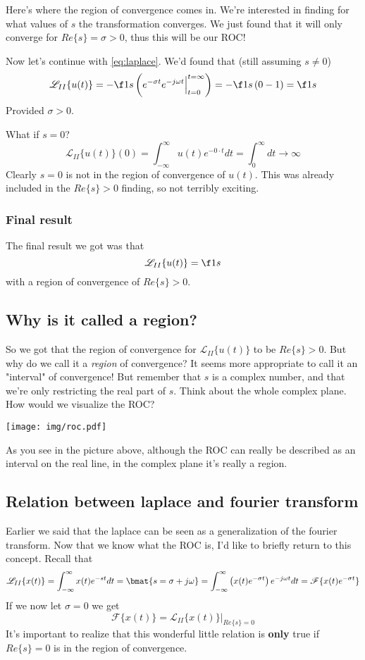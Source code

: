 \documentclass{article}
\newcommand{\0}{{\mathbf{0}}}
\begin{document}
Here's where the region of convergence comes in. We're interested in finding for what values of $s$ the transformation converges. We just
found that it will only converge for $Re\{ s \} = \sigma > 0$, thus this will be our ROC!

Now let's continue with \eqref{eq:laplace}.
We'd found that (still assuming $s\neq 0$)
$$  \mathscr{L}_{II} \{ u(t) \} = -\f 1s \left( e^{-\sigma t}e^{-j \omega t} \Big|_{t=0}^{t=\infty} \right) = -\f 1s \left( 0 - 1 \right) = \f 1s $$
Provided $\sigma > 0$.

What if $s=0$?
$$ \mathscr{L}_{II} \{ u(t) \}(0) = \int^{\infty}_{-\infty} u(t)e^{-0\cdot t} dt = \int^{\infty}_{0} dt \to \infty $$
Clearly $s=0$ is not in the region of convergence of $u(t)$. This was already included in the $Re\{ s \} > 0$ finding,
so not terribly exciting.

\subsubsection{Final result}
The final result we got was that
$$ \mathscr{L}_{II} \{ u(t) \} = \f 1s $$
with a region of convergence of $Re\{ s \} > 0$.

\clearpage
\subsection{Why is it called a region?}
So we got that the region of convergence for $\mathscr{L}_{II}\{ u(t) \}$ to be $Re\{ s \} > 0$. But why do
we call it a \textit{region} of convergence? It seems more appropriate to call it an "interval" of convergence!
But remember that $s$ is a complex number, and that we're only restricting the real part of $s$. Think about
the whole complex plane. How would we visualize the ROC?

\begin{center}
  \texttt{[image: img/roc.pdf]}
\end{center}

As you see in the picture above, although the ROC can really be described as an interval on the real line, in the complex plane
it's really a region.

\subsection{Relation between laplace and fourier transform}
Earlier we said that the laplace can be seen as a generalization of the fourier transform. Now that we know what the ROC is,
I'd like to briefly return to this concept. Recall that
$$ \mathscr{L}_{II}\{ x(t) \} = \int^{\infty}_{-\infty} x(t)e^{-st} dt = \bmat{s = \sigma + j\omega} = \int^{\infty}_{-\infty} \left( x(t)e^{-\sigma t} \right) e^{-j \omega t} dt = \mathscr{F}\{ x(t)e^{-\sigma t} \} $$
If we now let $\sigma = 0$ we get
$$ \mathscr{F}\{ x(t) \} = \mathscr{L}_{II}\{ x(t) \}\Big|_{Re\{ s \} = 0} $$
It's important to realize that this wonderful little relation is \textbf{only} true if $Re\{ s \} = 0$ is in the region of convergence.
\end{document}
